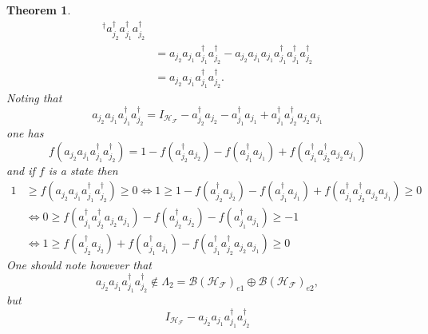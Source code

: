 \documentclass[aps,preprint]{revtex4}%
\newtheorem{theorem}{Theorem}
\begin{document}
\begin{theorem}
\begin{align}
{}^{\dagger}a_{j_{2}}^{\dagger}a_{j_{1}}^{\dagger}a_{j_{2}}^{\dagger
}\nonumber\\
&  =a_{j_{2}}a_{j_{1}}a_{j_{1}}^{\dagger}a_{j_{2}}^{\dagger}-a_{j_{2}}%
a_{j_{1}}a_{j_{1}}a_{j_{1}}^{\dagger}a_{j_{1}}^{\dagger}a_{j_{2}}^{\dagger
}\nonumber\\
&  =a_{j_{2}}a_{j_{1}}a_{j_{1}}^{\dagger}a_{j_{2}}^{\dagger}.
\end{align}
Noting that
\begin{equation}
a_{j_{2}}a_{j_{1}}a_{j_{1}}^{\dagger}a_{j_{2}}^{\dagger}=I_{\mathcal{H}%
_{\mathcal{F}}}-a_{j_{2}}^{\dagger}a_{j_{2}}-a_{j_{1}}^{\dagger}a_{j_{1}%
}+a_{j_{1}}^{\dagger}a_{j_{2}}^{\dagger}a_{j_{2}}a_{j_{1}}%
\end{equation}
one has
\begin{equation}
f\left(  a_{j_{2}}a_{j_{1}}a_{j_{1}}^{\dagger}a_{j_{2}}^{\dagger}\right)
=1-f\left(  a_{j_{2}}^{\dagger}a_{j_{2}}\right)  -f\left(  a_{j_{1}}^{\dagger
}a_{j_{1}}\right)  +f\left(  a_{j_{1}}^{\dagger}a_{j_{2}}^{\dagger}a_{j_{2}%
}a_{j_{1}}\right)
\end{equation}
and if $f$ is a state then
\begin{align}
1  &  \geq f\left(  a_{j_{2}}a_{j_{1}}a_{j_{1}}^{\dagger}a_{j_{2}}^{\dagger
}\right)  \geq0\Leftrightarrow1\geq1-f\left(  a_{j_{2}}^{\dagger}a_{j_{2}%
}\right)  -f\left(  a_{j_{1}}^{\dagger}a_{j_{1}}\right)  +f\left(  a_{j_{1}%
}^{\dagger}a_{j_{2}}^{\dagger}a_{j_{2}}a_{j_{1}}\right)  \geq0\nonumber\\
&  \Leftrightarrow0\geq f\left(  a_{j_{1}}^{\dagger}a_{j_{2}}^{\dagger
}a_{j_{2}}a_{j_{1}}\right)  -f\left(  a_{j_{2}}^{\dagger}a_{j_{2}}\right)
-f\left(  a_{j_{1}}^{\dagger}a_{j_{1}}\right)  \geq-1\nonumber\\
&  \Leftrightarrow1\geq f\left(  a_{j_{2}}^{\dagger}a_{j_{2}}\right)
+f\left(  a_{j_{1}}^{\dagger}a_{j_{1}}\right)  -f\left(  a_{j_{1}}^{\dagger
}a_{j_{2}}^{\dagger}a_{j_{2}}a_{j_{1}}\right)  \geq0
\end{align}
\emph{One should note however that}
\begin{equation}
a_{j_{2}}a_{j_{1}}a_{j_{1}}^{\dagger}a_{j_{2}}^{\dagger}\notin\Lambda
_{2}=\mathcal{B}\left(  \mathcal{H}_{\mathcal{F}}\right)  _{e1}\oplus
\mathcal{B}\left(  \mathcal{H}_{\mathcal{F}}\right)  _{e2},
\end{equation}
but
\begin{equation}
I_{\mathcal{H}_{\mathcal{F}}}-a_{j_{2}}a_{j_{1}}a_{j_{1}}^{\dagger}a_{j_{2}%
}^{\dagger}%
\end{equation}

\end{theorem}
\end{document}
